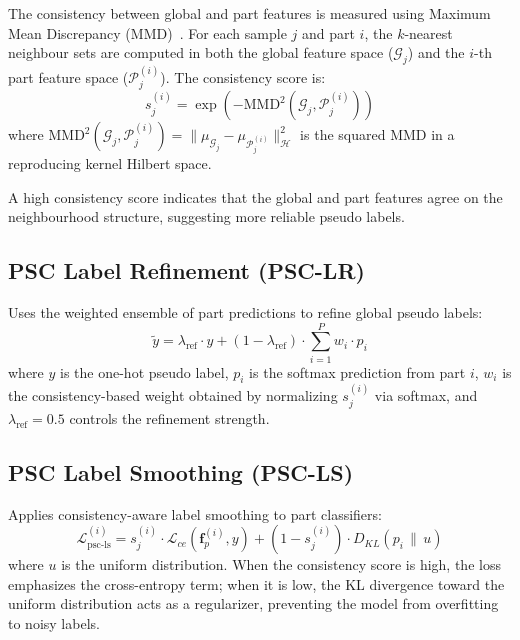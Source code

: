 The consistency between global and part features is measured using Maximum Mean Discrepancy (MMD)~\cite{gretton2012mmd}. For each sample $j$ and part $i$, the $k$-nearest neighbour sets are computed in both the global feature space ($\mathcal{G}_j$) and the $i$-th part feature space ($\mathcal{P}_j^{(i)}$). The consistency score is:
\begin{equation}
    s_j^{(i)} = \exp\left(-\text{MMD}^2(\mathcal{G}_j, \mathcal{P}_j^{(i)})\right)
\end{equation}
where $\text{MMD}^2(\mathcal{G}_j, \mathcal{P}_j^{(i)}) = \|\mu_{\mathcal{G}_j} - \mu_{\mathcal{P}_j^{(i)}}\|_{\mathcal{H}}^2$ is the squared MMD in a reproducing kernel Hilbert space.

A high consistency score indicates that the global and part features agree on the neighbourhood structure, suggesting more reliable pseudo labels.

\subsection{PSC Label Refinement (PSC-LR)}

Uses the weighted ensemble of part predictions to refine global pseudo labels:
\begin{equation}
    \tilde{y} = \lambda_{\text{ref}} \cdot y + (1 - \lambda_{\text{ref}}) \cdot \sum_{i=1}^{P} w_i \cdot p_i
\end{equation}
where $y$ is the one-hot pseudo label, $p_i$ is the softmax prediction from part $i$, $w_i$ is the consistency-based weight obtained by normalizing $s_j^{(i)}$ via softmax, and $\lambda_{\text{ref}} = 0.5$ controls the refinement strength.

\subsection{PSC Label Smoothing (PSC-LS)}

Applies consistency-aware label smoothing to part classifiers:
\begin{equation}
    \mathcal{L}_{\text{psc-ls}}^{(i)} = s_j^{(i)} \cdot \mathcal{L}_{ce}(\mathbf{f}_p^{(i)}, y) + (1 - s_j^{(i)}) \cdot D_{KL}(p_i \,\|\, u)
\end{equation}
where $u$ is the uniform distribution. When the consistency score is high, the loss emphasizes the cross-entropy term; when it is low, the KL divergence toward the uniform distribution acts as a regularizer, preventing the model from overfitting to noisy labels.

